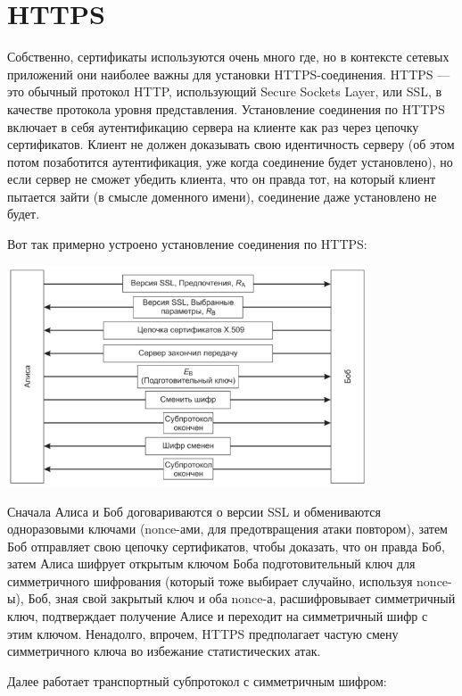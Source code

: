 \documentclass{../../text-style}
\begin{document}
\section{HTTPS}

Собственно, сертификаты используются очень много где, но в контексте сетевых приложений они наиболее важны для установки HTTPS-соединения. HTTPS --- это обычный протокол HTTP, использующий Secure Sockets Layer, или SSL, в качестве протокола уровня представления. Установление соединения по HTTPS включает в себя аутентификацию сервера на клиенте как раз через цепочку сертификатов. Клиент не должен доказывать свою идентичность серверу (об этом потом позаботится аутентификация, уже когда соединение будет установлено), но если сервер не сможет убедить клиента, что он правда тот, на который клиент пытается зайти (в смысле доменного имени), соединение даже установлено не будет.

Вот так примерно устроено установление соединения по HTTPS:

\begin{center}
    \includegraphics[width=0.8\textwidth]{ssl.png}
\end{center}

Сначала Алиса и Боб договариваются о версии SSL и обмениваются одноразовыми ключами (nonce-ами, для предотвращения атаки повтором), затем Боб отправляет свою цепочку сертификатов, чтобы доказать, что он правда Боб, затем Алиса шифрует открытым ключом Боба подготовительный ключ для симметричного шифрования (который тоже выбирает случайно, используя nonce-ы), Боб, зная свой закрытый ключ и оба nonce-а, расшифровывает симметричный ключ, подтверждает получение Алисе и переходит на симметричный шифр с этим ключом. Ненадолго, впрочем, HTTPS предполагает частую смену симметричного ключа во избежание статистических атак.

Далее работает транспортный субпротокол с симметричным шифром: 
\end{document}
